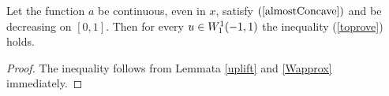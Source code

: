 \begin{cor}
Let the function $a$ be continuous, even in $x$, satisfy $(\ref{almostConcave})$
and be decreasing on $[0, 1]$. Then for every $u \in W_1^1(-1, 1)$ the inequality (\ref{toprove}) holds.
\end{cor}

\begin{proof}
The inequality follows from Lemmata \ref{uplift} and \ref{Wapprox} immediately.
\end{proof}

